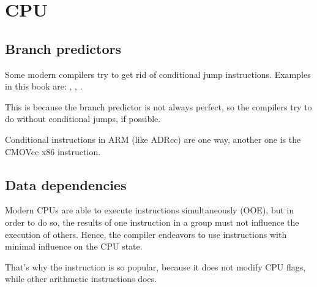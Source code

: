 ﻿\chapter{CPU}

\section{Branch predictors}
\label{branch_predictors}

Some modern compilers try to get rid of conditional jump instructions.
Examples in this book are: , , .

This is because the branch predictor is not always perfect, so the compilers try to do 
without conditional jumps, if possible.

Conditional instructions in ARM (like ADRcc) are one way, another one is the CMOVcc x86 instruction.

\section{Data dependencies}

Modern CPUs are able to execute instructions simultaneously (\ac{OOE}), but in order to do so,
the results of one instruction in a group must not influence the execution of others.
Hence, the compiler endeavors to use instructions with minimal influence on the CPU state.

That's why the \LEA instruction is so popular, because it does not modify CPU flags, while
other arithmetic instructions does.

